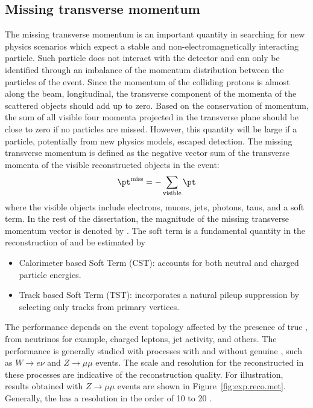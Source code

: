\subsection{Missing transverse momentum}
The missing transverse momentum is an important quantity in searching for new physics scenarios which expect a stable and non-electromagnetically interacting 
particle. Such particle does not interact with the detector and can only be identified through an imbalance of the momentum distribution between the particles 
of the event. 
Since the momentum of the colliding protons is almost along the beam, longitudinal, the transverse component of the momenta of the scattered objects should add 
up to zero.
Based on the conservation of momentum, the sum of all visible four momenta projected in the transverse plane should be close to zero if no particles are missed.
However, this quantity will be large if a particle, potentially from new physics models, escaped detection. 
The missing transverse momentum is defined as the negative vector sum of the transverse momenta of the visible reconstructed objects in the event: 
\begin{equation}
\pt^{\rm{miss}} = - \sum_\text{visible} \pt
\end{equation}
where the visible objects include electrons, muons, jets, photons, taus, and a soft term.
In the rest of the dissertation, the magnitude of the missing transverse momentum vector is denoted by \met.
The soft term  is  a fundamental quantity in the reconstruction of \met and be estimated by 
\begin{itemize}
\item Calorimeter based Soft Term (CST): accounts for both neutral and charged particle energies.
\item Track based Soft Term (TST): incorporates a natural pileup suppression by selecting only tracks from primary vertices.
\end{itemize}

The \met performance depends on the event topology affected by the presence of true \met, from neutrinos for example,
charged leptons, jet activity, and others.
The \met performance is generally studied with processes with and without genuine \met, such as 
$W \to e \nu$ and $Z\to\mu\mu$ events. 
The scale and resolution for the reconstructed \met in these processes are indicative of the reconstruction quality.
For illustration, results obtained with  $Z\to\mu\mu$ events are shown in Figure~\ref{fig:exp.reco.met}.
Generally, the \met has a resolution in the order of 10 to 20 \GeV.


